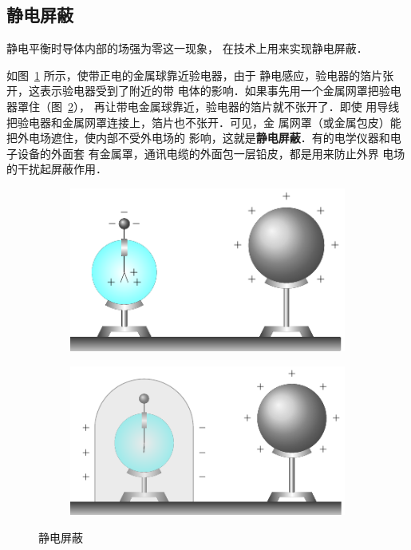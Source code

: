 \subsection{静电屏蔽}

静电平衡时导体内部的场强为零这一现象，
在技术上用来实现静电屏蔽．


如图~\ref{fig_B_6-15a} 所示，使带正电的金属球靠近验电器，由于
静电感应，验电器的箔片张开，这表示验电器受到了附近的带
电体的影响．如果事先用一个金属网罩把验电器罩住（图~\ref{fig_B_6-15b}），
再让带电金属球靠近，验电器的箔片就不张开了．即使
用导线把验电器和金属网罩连接上，箔片也不张开．可见，金
属网罩（或金属包皮）能把外电场遮住，使内部不受外电场的
影响，这就是\textbf{静电屏蔽}．有的电学仪器和电子设备的外面套
有金属罩，通讯电缆的外面包一层铅皮，都是用来防止外界
电场的干扰起屏蔽作用．

\begin{figure}[htbp]
    \centering
    \begin{subfigure}{0.4\linewidth}
        \centering
        \includegraphics{fig/B/6-15a.pdf}
        \caption{}\label{fig_B_6-15a}
    \end{subfigure}
    \hfil
    \begin{subfigure}{0.4\linewidth}
        \centering
        \includegraphics{fig/B/6-15b.pdf}
        \caption{}\label{fig_B_6-15b}
    \end{subfigure}
    \caption{静电屏蔽}\label{fig_B_6-15}
\end{figure}


